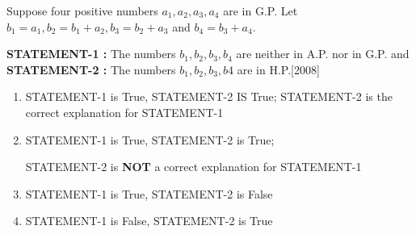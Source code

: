 \iffalse
\title{Assignment -1}
\author{ee24btech10017-karthik}
\section{ar}
\fi
    

\item Suppose four positive numbers $a_{1},a_{2},a_{3},a_{4}$ are in G.P. Let $b_{1} = a_{1}, b_{2} = b_{1} + a_{2}, b_{3} = b_{2} + a_{3}$ and $b_{4} = b_{3} + a_{4}$.

\textbf{STATEMENT-1 :} The numbers $b_{1},b_{2},b_{3},b_{4}$ are neither in A.P. nor in G.P. and \textbf{STATEMENT-2 :} The numbers $b_{1},b_{2},b_{3},b{4}$ are in H.P.\hfill[2008]

\begin{enumerate}
    

\item STATEMENT-1 is True, STATEMENT-2 IS True; STATEMENT-2 is the correct explanation for STATEMENT-1

\item STATEMENT-1 is True, STATEMENT-2 is True;

STATEMENT-2 is \textbf{NOT} a correct explanation for STATEMENT-1

\item STATEMENT-1 is True, STATEMENT-2 is False

\item STATEMENT-1 is False, STATEMENT-2 is True
\end{enumerate}
